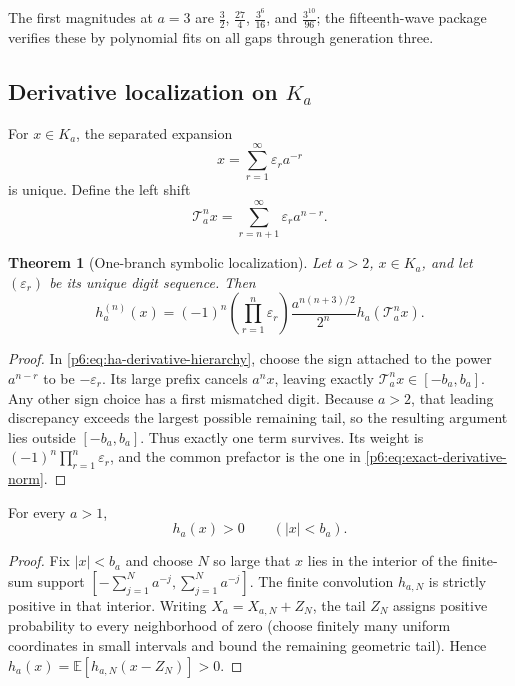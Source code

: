 \documentclass[11pt,oneside]{article}
\numberwithin{equation}{section}
\newtheorem{theorem}{Theorem}[section]
\theoremstyle{definition}
\theoremstyle{remark}
\newcommand{\E}{\mathbb E}
\begin{document}
The first magnitudes at $a=3$ are $\tfrac32$, $\tfrac{27}4$,
$\tfrac{3^6}{16}$, and $\tfrac{3^{10}}{96}$; the fifteenth-wave package
verifies these by polynomial fits on all gaps through generation three.

\subsection{Derivative localization on \texorpdfstring{$K_a$}{K-a}}

For $x\in K_a$, the separated expansion
\begin{equation}\label{p6:eq:digit-expansion}
 x=\sum_{r=1}^{\infty}\varepsilon_ra^{-r}
\end{equation}
is unique.  Define the left shift
\begin{equation}\label{p6:eq:Ta-shift}
 \mathcal T_a^n x
 =\sum_{r=n+1}^{\infty}\varepsilon_ra^{n-r}.
\end{equation}

\begin{theorem}[One-branch symbolic localization]\label{p6:thm:symbolic-localization}
Let $a>2$, $x\in K_a$, and let $(\varepsilon_r)$ be its unique digit sequence.
Then
\begin{equation}\label{p6:eq:symbolic-localization}
 h_a^{(n)}(x)=
 (-1)^n\left(\prod_{r=1}^{n}\varepsilon_r\right)
 \frac{a^{n(n+3)/2}}{2^n}
 h_a(\mathcal T_a^n x).
\end{equation}
\end{theorem}

\begin{proof}
In \eqref{p6:eq:ha-derivative-hierarchy}, choose the sign attached to the power
$a^{n-r}$ to be $-\varepsilon_r$.  Its large prefix cancels
$a^nx$, leaving exactly $\mathcal T_a^nx\in[-b_a,b_a]$.  Any other sign choice
has a first mismatched digit.  Because $a>2$, that leading discrepancy exceeds
the largest possible remaining tail, so the resulting argument lies outside
$[-b_a,b_a]$.  Thus exactly one term survives.  Its weight is
$(-1)^n\prod_{r=1}^{n}\varepsilon_r$, and the common prefactor is the one in
\eqref{p6:eq:exact-derivative-norm}.
\end{proof}

\begin{lemma}\label{p6:lem:positive-interior}
For every $a>1$,
\[
 h_a(x)>0\qquad (|x|<b_a).
\]
\end{lemma}

\begin{proof}
Fix $|x|<b_a$ and choose $N$ so large that $x$ lies in the interior of the
finite-sum support
$[-\sum_{j=1}^N a^{-j},\sum_{j=1}^N a^{-j}]$.  The finite convolution
$h_{a,N}$ is strictly positive in that interior.  Writing
$X_a=X_{a,N}+Z_N$, the tail $Z_N$ assigns positive probability to every
neighborhood of zero (choose finitely many uniform coordinates in small
intervals and bound the remaining geometric tail).  Hence
$h_a(x)=\E[h_{a,N}(x-Z_N)]>0$.
\end{proof}
\end{document}
